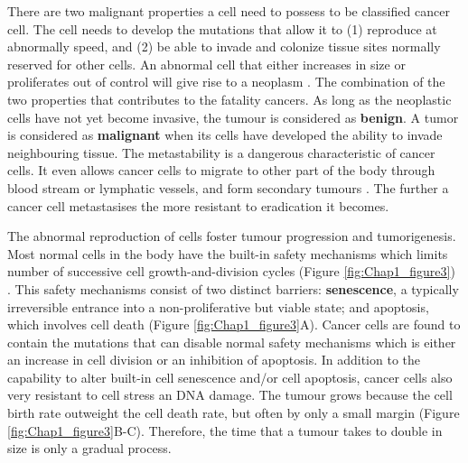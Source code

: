 There are two malignant properties a cell need to possess to be classified cancer cell. The cell needs to develop the mutations that allow it to (1) reproduce at abnormally speed, and (2) be able to invade and colonize tissue sites normally reserved for other cells. An abnormal cell that either increases in size or proliferates out of control will give rise to a neoplasm \cite{alberts2018molecular, hanahan2000hallmarks}. The combination of the two properties that contributes to the fatality cancers. As long as the neoplastic cells have not yet become invasive, the tumour is considered as \textbf{benign}. A tumor is considered as \textbf{malignant} when its cells have developed the ability to invade neighbouring tissue. The metastability is a dangerous characteristic of cancer cells. It even allows cancer cells to migrate to other part of the body through blood stream or lymphatic vessels, and form secondary tumours \cite{alberts2018molecular}. The further a cancer cell metastasises the more resistant to eradication it becomes.   

The abnormal reproduction of cells foster tumour progression and tumorigenesis. Most normal cells in the body have the built-in safety mechanisms which limits number of successive cell growth-and-division cycles (Figure \ref{fig:Chap1_figure3}) \cite{hanahan2000hallmarks, hanahan2011hallmarksnext}. This safety mechanisms consist of two distinct barriers: \textbf{senescence}, a typically irreversible entrance into a non-proliferative but viable state; and apoptosis, which involves cell death (Figure \ref{fig:Chap1_figure3}A). Cancer cells are found to contain the mutations that can disable normal safety mechanisms which is either an increase in cell division or an inhibition of apoptosis. In addition to the capability to alter built-in cell senescence and/or cell apoptosis, cancer cells also very resistant to cell stress an DNA damage. The tumour grows because the cell birth rate outweight the cell death rate, but often by only a small margin (Figure \ref{fig:Chap1_figure3}B-C). Therefore, the time that a tumour takes to double in size is only a gradual process.

